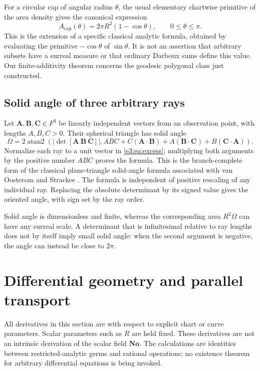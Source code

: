 \documentclass[11pt,letterpaper]{article}
\numberwithin{equation}{section}
\theoremstyle{definition}
\theoremstyle{remark}
\newcommand{\No}{\mathbf{No}}
\newcommand{\atantwo}{\operatorname{atan2}}
\newcommand{\vv}[1]{\bm{#1}}
\begin{document}
For a circular cap of angular radius $\theta$, the usual elementary
chartwise primitive of the area density gives the canonical expression
\[
 A_{\mathrm{cap}}(\theta)=2\pi R^2(1-\cos\theta),\qquad0\le\theta\le\pi.
\]
This is the extension of a specific classical analytic formula, obtained by
evaluating the primitive $-\cos\theta$ of $\sin\theta$. It is not an
assertion that arbitrary subsets have a surreal measure or that ordinary
Darboux sums define this value. Our finite-additivity theorem concerns the
geodesic polygonal class just constructed.

\subsection{Solid angle of three arbitrary rays}

Let $\vv A,\vv B,\vv C\in F^3$ be linearly independent vectors from an
observation point, with lengths $A,B,C>0$. Their spherical triangle has
solid angle
\begin{equation}\label{e3:eq:solidangle}
 \Omega=2\atantwo\left(
 |\det[\vv A\ \vv B\ \vv C]|,
 ABC+C(\vv A\cdot\vv B)+A(\vv B\cdot\vv C)+B(\vv C\cdot\vv A)
 \right).
\end{equation}
Normalize each ray to a unit vector in \cref{e3:eq:excess}; multiplying both
arguments by the positive number $ABC$ proves the formula. This is the
branch-complete form of the classical plane-triangle solid-angle formula
associated with van Oosterom and Strackee \cite{Oosterom}. The formula is
independent of positive rescaling of any individual ray. Replacing the
absolute determinant by its signed value gives the oriented angle, with
sign set by the ray order.

Solid angle is dimensionless and finite, whereas the corresponding area
$R^2\Omega$ can have any surreal scale. A determinant that is infinitesimal
relative to ray lengths does not by itself imply small solid angle: when the
second argument is negative, the angle can instead be close to $2\pi$.

\section{Differential geometry and parallel transport}\label{e3:sec:differential}

All derivatives in this section are with respect to explicit chart or curve
parameters. Scalar parameters such as $R$ are held fixed. These derivatives
are not an intrinsic derivation of the scalar field $\No$. The calculations
are identities between restricted-analytic germs and rational operations;
no existence theorem for arbitrary differential equations is being invoked.
\end{document}
